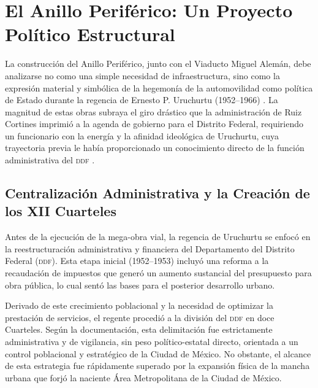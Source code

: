 
\section{El Anillo Periférico: Un Proyecto Político Estructural}
\label{sec:anillo-periferico}

La construcción del Anillo Periférico, junto con el Viaducto Miguel Alemán, debe
analizarse no como una simple necesidad de infraestructura, sino como la
expresión material y simbólica de la hegemonía de la automovilidad como política
de Estado durante la regencia de Ernesto P. Uruchurtu (1952--1966)
\citep{franco2022}. La magnitud de estas obras subraya el giro drástico que la
administración de Ruiz Cortines imprimió a la agenda de gobierno para el
Distrito Federal, requiriendo un funcionario con la energía y la afinidad
ideológica de Uruchurtu, cuya trayectoria previa le había proporcionado un
conocimiento directo de la función administrativa del \textsc{ddf}
\citep[Tomo~1, p.~173]{perlo2023}.

\subsection{Centralización Administrativa y la Creación de los XII Cuarteles}
\label{subsec:xii-cuarteles}

Antes de la ejecución de la mega-obra vial, la regencia de Uruchurtu se enfocó
en la reestructuración administrativa y financiera del Departamento del Distrito
Federal (\textsc{ddf}). Esta etapa inicial (1952--1953) incluyó una reforma a la
recaudación de impuestos que generó un aumento sustancial del presupuesto para
obra pública, lo cual sentó las bases para el posterior desarrollo urbano.

Derivado de este crecimiento poblacional y la necesidad de optimizar la
prestación de servicios, el regente procedió a la división del \textsc{ddf} en
doce Cuarteles. Según la documentación, esta delimitación fue estrictamente
administrativa y de vigilancia, sin peso político-estatal directo, orientada a
un control poblacional y estratégico de la Ciudad de México. No obstante, el
alcance de esta estrategia fue rápidamente superado por la expansión física de
la mancha urbana que forjó la naciente Área Metropolitana de la Ciudad de
México.

